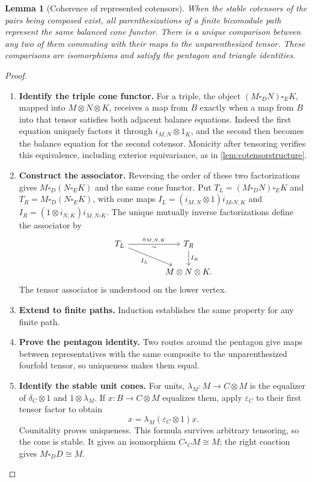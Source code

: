 \documentclass[11pt,reqno]{amsart}
\theoremstyle{plain}
\newtheorem{lemma}[theorem]{Lemma}
\theoremstyle{definition}
\theoremstyle{remark}
\numberwithin{equation}{section}
\newcommand{\eps}{\varepsilon}
\begin{document}
\begin{lemma}[Coherence of represented cotensors]\label{lem:cotensorcoherence}
When the stable cotensors of the pairs being composed exist, all
parenthesizations of a finite bicomodule path represent the same balanced
cone functor. There is a unique comparison between any two of them
commuting with their maps to the unparenthesized tensor. These comparisons
are isomorphisms and satisfy the pentagon and triangle identities.
\end{lemma}
\begin{proof}\leavevmode
\begin{enumerate}
\item \textbf{Identify the triple cone functor.} For a triple, the object $(M\square_D N)\square_E K$, mapped into
$M\otimes N\otimes K$, receives a map from $B$ exactly when a map
from $B$ into that tensor satisfies both adjacent balance equations.
Indeed the first equation uniquely factors it through
$i_{M,N}\otimes1_K$, and the second then becomes the balance
equation for the second cotensor. Monicity after tensoring verifies
this equivalence, including exterior equivariance, as in
\cref{lem:cotensorstructure}.

\item \textbf{Construct the associator.} Reversing the order of these two
factorizations gives $M\square_D(N\square_E K)$ and the same
cone functor. Put $T_L=(M\square_D N)\square_E K$ and
$T_R=M\square_D(N\square_E K)$, with cone maps
$I_L=(i_{M,N}\otimes1)i_{M\square N,K}$ and
$I_R=(1\otimes i_{N,K})i_{M,N\square K}$.
The unique mutually inverse factorizations define the associator by
\[
\begin{tikzcd}[column sep=4em]
T_L \arrow[r,"a_{M,N,K}","\sim"'] \arrow[dr,"I_L"'] &
T_R \arrow[d,"I_R"]\\
& M\otimes N\otimes K.
\end{tikzcd}
\]
The tensor associator is understood on the lower vertex.

\item \textbf{Extend to finite paths.} Induction
establishes the same property for any finite path.

\item \textbf{Prove the pentagon identity.} Two routes around
the pentagon give maps between representatives with the same composite
to the unparenthesized fourfold tensor, so uniqueness makes them equal.

\item \textbf{Identify the stable unit cones.} For units, $\lambda_M:M\to C\otimes M$ is the equalizer of
$\delta_C\otimes1$ and $1\otimes\lambda_M$. If $x:B\to C\otimes M$
equalizes them, apply $\eps_C$ to their first tensor factor to obtain
\[
 x=\lambda_M(\eps_C\otimes1)x.
\]
Counitality proves uniqueness. This formula survives arbitrary tensoring,
so the cone is stable. It gives an isomorphism $C\square_C M\cong M$;
the right coaction gives $M\square_D D\cong M$.


\end{enumerate}
\end{proof}
\end{document}
